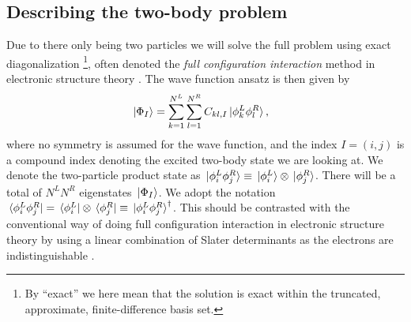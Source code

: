\documentclass[twocolumn,superscriptaddress,unsortedaddress,
 amsmath,amssymb,
 aps,
]{revtex4-2}
\begin{document}
    \subsection{Describing the two-body problem}
        Due to there only being two particles we will solve the full problem
        using exact diagonalization \footnote{
            By ``exact'' we here mean that the solution is exact within the
            truncated, approximate, finite-difference basis set.
        }, often denoted the \emph{full configuration interaction} method
        in electronic structure theory \cite{the-pink-book}.
        The wave function ansatz is then given by
        \begin{align}
            \ket*{\Phi_I}
            &= \sum_{k = 1}^{N^L} \sum_{l = 1}^{N^R} C_{kl, I}
            \ket*{\phi^{L}_k \phi^{R}_l},
            \label{eq:wave-function-ansatz}
        \end{align}
        where no symmetry is assumed for the wave function, and the index
        $I = (i, j)$ is a compound index denoting the excited two-body
        state we are looking at.
        We denote the two-particle product state as $\ket*{\phi^L_i \phi^R_j}
        \equiv \ket*{\phi^L_i} \otimes \ket*{\phi^R_j}$.
        There will be a total of $N^L N^R$ eigenstates $\ket*{\Phi_I}$.
        We adopt the notation $\bra*{\phi^L_i \phi^R_j}
        = \bra*{\phi^L_i} \otimes \bra*{\phi^R_j}
        \equiv \ket*{\phi^L_i \phi^R_j}^{\dagger}$.
        This should be contrasted with the conventional way of doing full
        configuration interaction in electronic structure theory by using
        a linear combination of Slater determinants as the electrons are
        indistinguishable \cite{the-pink-book}.
\end{document}
